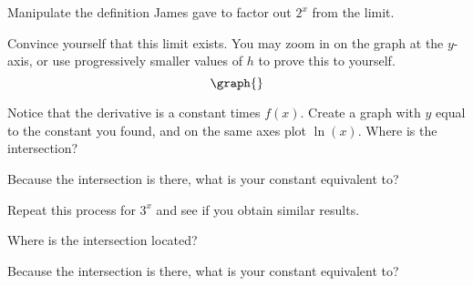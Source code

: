 \documentclass{ximera}
\begin{document}
\begin{question}

Manipulate the definition James gave to factor out $2^x$ from the limit.
\begin{multipleChoice}
\end{multipleChoice}

Convince yourself that this limit exists. You may zoom in on the graph at the $y$-axis, or use progressively smaller values of $h$ to prove this to yourself.
\[
\graph{}
\]

\begin{onlineOnly}
\begin{sageCell}

\end{sageCell}
\end{onlineOnly}

Notice that the derivative is a constant times $f(x)$. Create a graph with $y$ equal to the constant you found, and on the same axes plot $\ln \left(x\right)$. Where is the intersection?

\begin{multipleChoice}
\end{multipleChoice}

Because the intersection is there, what is your constant equivalent to?

\begin{multipleChoice}
\choice[correct]{$\ln\left(2\right)$}
\end{multipleChoice}

Repeat this process for $3^x$ and see if you obtain similar results.

Where is the intersection located?

\begin{multipleChoice}
\end{multipleChoice}

Because the intersection is there, what is your constant equivalent to?

\begin{multipleChoice}
\choice[correct]{$\ln\left(3\right)$}
\end{multipleChoice}
\end{question}
\end{document}
